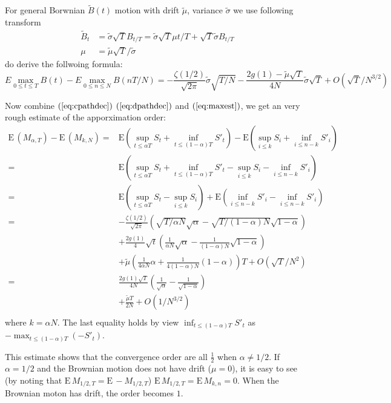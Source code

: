 \documentclass[11pt]{book}
\def\tB{{\widetilde{B}}}
\def\tmu{{\widetilde{\mu}}}
\def\tsigma{{\widetilde{\sigma}}}
\def\E{{\mathrm{E}\,}}
\def\EE#1{{{\mathrm{E}}\left(#1\right)}}
\begin{document}
For general Borwnian $\tB(t)$ motion with drift $\tmu$, variance $\tsigma$
we use following transform
\begin{align*}
\tB_t &= \tsigma \sqrt{T} B_{t/T} = \tsigma \sqrt{T} \mu t/T 
+ \sqrt{T}\tsigma B_{t/T}\\
\mu &= \tmu \sqrt{T}/\tsigma 
\end{align*}
do derive the follwoing formula:
\begin{equation}\label{eq:maxest}
E\max_{0\leq t\leq T} B(t) - E \max_{0\leq n \leq N} B(nT/N) = 
 -\frac{\zeta(1/2)}{\sqrt{2\pi}}\tsigma \sqrt{T/N}
 -\frac{2g(1)-\tmu\sqrt{T}}{4N}\tsigma\sqrt{T} + 
O(\sqrt{T}/N^{3/2})
\end{equation}

Now combine $(\ref{eq:cpathdec})$ $(\ref{eq:dpathdec})$ and $(\ref{eq:maxest})$,
we get an very rough estimate of the apporximation order:
\begin{equation}
\begin{split}
\E (M_{\alpha,T}) - \E (M_{k,N})
=& \EE{\sup_{t\leq \alpha{T}} S_t +\inf_{t \leq (1-\alpha)T}S'_t} 
- \EE{\sup_{i\leq k} S_i+\inf_{i\leq n-k} S'_i}\\
=& \EE{\sup_{t\leq \alpha{T}} S_t +\inf_{t \leq (1-\alpha)T}S'_t
-  \sup_{i\leq k} S_i-\inf_{i\leq n-k} S'_i} \\
= &  \EE{\sup_{t\leq \alpha{T}} S_t - \sup_{i\leq k} S_i} +
\EE{\inf_{i\leq n-k} S'_i-\inf_{i\leq n-k} S'_i}\\
=& -\frac{\zeta(1/2)}{\sqrt{2\pi}}\left(\sqrt{T/\alpha N} 
\sqrt{\alpha} - \sqrt{T/(1-\alpha)N}\sqrt{1-\alpha}\right) \\
& + \frac{2g(1)}{4}\sqrt{t}
\left(\frac{1}{\alpha N} \sqrt{\alpha} 
  - \frac{1}{(1-\alpha)N}\sqrt{1-\alpha}\right) \\
& + \tmu \left( \frac{1}{4\alpha N}\alpha
  +\frac{1}{4(1-\alpha)N}(1-\alpha)\right)T
+ O(\sqrt{T}/N^2) \\
=& \frac{2g(1)\sqrt{T}}{4N}
\left(\frac{1}{\sqrt{\alpha}} 
  - \frac{1}{\sqrt{1-\alpha}}\right) \\
& + \frac{\tmu T}{2 N}
+ O(1/N^{3/2}) \\
\end{split}
\end{equation}
where $k = \alpha N$.
The last equality holds by view $\inf_{t\leq (1-\alpha)T} S'_t$ as 
$-\max_{t\leq (1-\alpha)T} (-S'_t)$.

This estimate shows that the convergence order 
are all $\frac{1}{2}$ when $\alpha \neq 1/2$. If $\alpha=1/2$ and the 
Brownian motion does not have  drift ($\mu=0$), it is easy to see 
(by noting that 
$\E M_{1/2,T} = \E -M_{1/2,T}$) $\E M_{1/2,T} = \E M_{k,n} = 0$. 
When the Brownian moton has drift, the order becomes $1$. 
\end{document}
